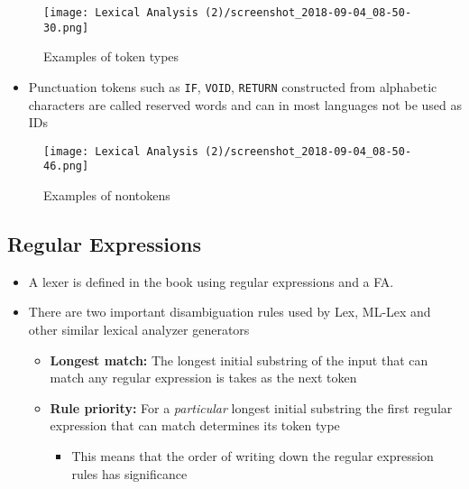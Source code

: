 \documentclass[11pt]{article}
\begin{document}
\begin{figure}[htbp]
\centering
\texttt{[image: Lexical Analysis (2)/screenshot\_2018-09-04\_08-50-30.png]}
\caption{\label{fig:org496fbfd}
Examples of token types}
\end{figure}

\begin{itemize}
\item Punctuation tokens such as \texttt{IF}, \texttt{VOID}, \texttt{RETURN} constructed from alphabetic characters are called reserved words and can in most languages not be used as IDs
\end{itemize}

\begin{figure}[htbp]
\centering
\texttt{[image: Lexical Analysis (2)/screenshot\_2018-09-04\_08-50-46.png]}
\caption{\label{fig:org73e86b2}
Examples of nontokens}
\end{figure}

\subsection{Regular Expressions}
\label{sec:org5967269}
\begin{itemize}
\item A lexer is defined in the book using regular expressions and a FA.

\item There are two important disambiguation rules used by Lex, ML-Lex and other similar lexical analyzer generators
\begin{itemize}
\item \textbf{Longest match:} The longest initial substring of the input that can match any regular expression is takes as the next token
\item \textbf{Rule priority:} For a \emph{particular} longest initial substring the first regular expression that can match determines its token type
\begin{itemize}
\item This means that the order of writing down the regular expression rules has significance
\end{itemize}
\end{itemize}
\end{itemize}
\end{document}
